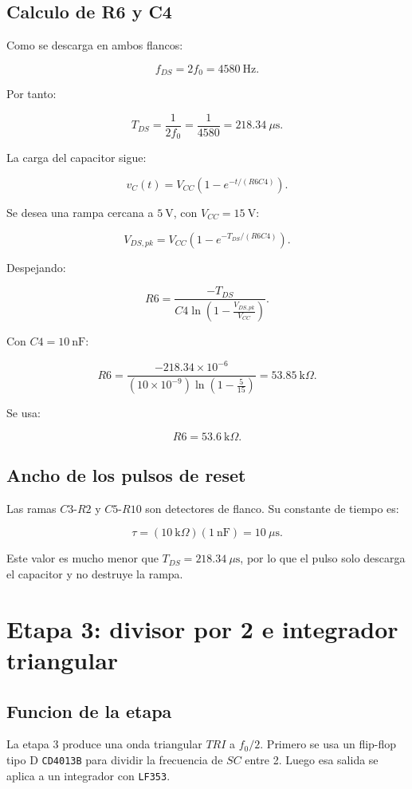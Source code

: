 ﻿\documentclass[11pt,letterpaper]{article}
\newcommand{\kohm}{\text{k}\Omega}
\begin{document}
\subsection{Calculo de R6 y C4}

Como se descarga en ambos flancos:

\[
f_{DS}=2f_0=4580~\text{Hz}.
\]

Por tanto:

\[
T_{DS}=\frac{1}{2f_0}
=\frac{1}{4580}
=218.34~\mu\text{s}.
\]

La carga del capacitor sigue:

\[
v_C(t)=V_{CC}\left(1-e^{-t/(R6C4)}\right).
\]

Se desea una rampa cercana a \(5~\text{V}\), con \(V_{CC}=15~\text{V}\):

\[
V_{DS,pk}=V_{CC}\left(1-e^{-T_{DS}/(R6C4)}\right).
\]

Despejando:

\[
R6=
\frac{-T_{DS}}
{C4\ln\left(1-\frac{V_{DS,pk}}{V_{CC}}\right)}.
\]

Con \(C4=10~\text{nF}\):

\[
R6=
\frac{-218.34\times10^{-6}}
{(10\times10^{-9})\ln\left(1-\frac{5}{15}\right)}
=53.85~\kohm.
\]

Se usa:

\[
\boxed{R6=53.6~\kohm}.
\]

\subsection{Ancho de los pulsos de reset}

Las ramas \(C3\)-\(R2\) y \(C5\)-\(R10\) son detectores de flanco. Su constante
de tiempo es:

\[
\tau=(10~\kohm)(1~\text{nF})=10~\mu\text{s}.
\]

Este valor es mucho menor que \(T_{DS}=218.34~\mu\text{s}\), por lo que el
pulso solo descarga el capacitor y no destruye la rampa.

\section{Etapa 3: divisor por 2 e integrador triangular}

\subsection{Funcion de la etapa}

La etapa 3 produce una onda triangular \(TRI\) a \(f_0/2\). Primero se usa un
flip-flop tipo D \texttt{CD4013B} para dividir la frecuencia de \(SC\) entre 2.
Luego esa salida se aplica a un integrador con \texttt{LF353}.
\end{document}
